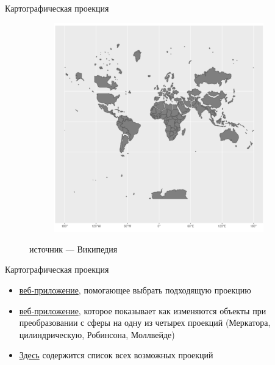 \documentclass[
  ignorenonframetext,
  t]{beamer}
\providecommand{\tightlist}{%
  \setlength{\itemsep}{0pt}\setlength{\parskip}{0pt}}\usepackage{longtable,booktabs,array}
\begin{document}
\begin{frame}{Картографическая проекция}
\begin{figure}
\begin{minipage}{0.50\linewidth}
\begin{figure}[H]
{\centering \includegraphics[width=1\linewidth,height=\textheight,keepaspectratio]{images/08-Merkator-2.png}

}


\end{figure}%

\end{minipage}%
\newline
\begin{minipage}{0.50\linewidth}
источник --- Википедия\end{minipage}%

\end{figure}%
\end{frame}

\begin{frame}{Картографическая проекция}
\label{ux43aux430ux440ux442ux43eux433ux440ux430ux444ux438ux447ux435ux441ux43aux430ux44f-ux43fux440ux43eux435ux43aux446ux438ux44f-2}
\begin{itemize}
\tightlist
\item
  \href{https://projectionwizard.org/}{веб-приложение}, помогающее
  выбрать подходящую проекцию
\item
  \href{https://mathigon.org/course/circles/spheres-cones-cylinders\#sphere-maps}{веб-приложение},
  которое показывает как изменяются объекты при преобразовании с сферы
  на одну из четырех проекций (Меркатора, цилиндрическую, Робинсона,
  Моллвейде)
\item
  \href{https://proj.org/en/latest/operations/projections/all_images.html}{Здесь}
  содержится список всех возможных проекций
\end{itemize}
\end{frame}
\end{document}
